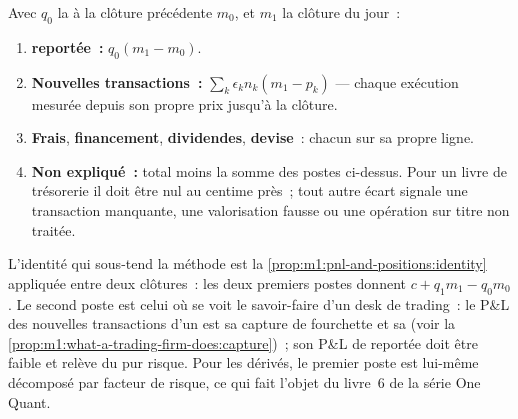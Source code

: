 \begin{method}\label{met:m1:pnl-and-positions:explain}
Avec $q_0$ la  à la clôture précédente $m_0$, et $m_1$ la clôture du jour~:
\begin{enumerate}
\item \textbf{ reportée~:} $q_0(m_1 - m_0)$.
\item \textbf{Nouvelles transactions~:} $\sum_k \epsilon_k n_k (m_1 - p_k)$ --- chaque exécution
  mesurée depuis son propre prix jusqu'à la clôture.
\item \textbf{Frais}, \textbf{financement}, \textbf{dividendes},
  \textbf{devise}~: chacun sur sa propre ligne.
\item \textbf{Non expliqué~:} total moins la somme des postes ci-dessus. Pour un livre de trésorerie
  il doit être nul au centime près~; tout autre écart signale une transaction manquante, une valorisation
  fausse ou une opération sur titre non traitée.
\end{enumerate}
\end{method}

L'identité qui sous-tend la méthode est
la \cref{prop:m1:pnl-and-positions:identity} appliquée entre deux clôtures~: les
deux premiers postes donnent $c + q_1 m_1 - q_0 m_0$. Le second poste est celui où se voit le savoir-faire
d'un desk de trading~: le P\&L des nouvelles transactions d'un  est sa capture de fourchette et
sa  (voir la \cref{prop:m1:what-a-trading-firm-does:capture})~; son
P\&L de  reportée doit être faible et relève du pur risque. Pour les dérivés, le premier poste
est lui-même décomposé par facteur de risque, ce qui fait l'objet du
livre~6 de la série One Quant.

